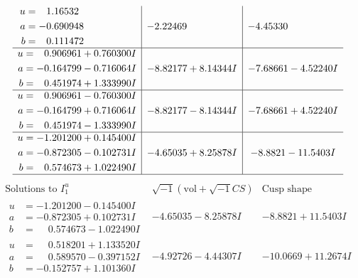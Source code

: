 \documentclass[1p]{elsarticle_modified}
\theoremstyle{definition}
\newcommand{\I}{\sqrt{-1}}
\begin{document}
$$\begin{array}{c|c|c}
\begin{aligned}
u &= \phantom{-}1.16532\phantom{ +0.000000I} \\
a &= -0.690948\phantom{ +0.000000I} \\
b &= \phantom{-}0.111472\phantom{ +0.000000I}\end{aligned}
 & -2.22469\phantom{ +0.000000I} & -4.45330\phantom{ +0.000000I} \\ \hline\begin{aligned}
u &= \phantom{-}0.906961 + 0.760300 I \\
a &= -0.164799 - 0.716064 I \\
b &= \phantom{-}0.451974 + 1.333990 I\end{aligned}
 & -8.82177 + 8.14344 I & -7.68661 - 4.52240 I \\ \hline\begin{aligned}
u &= \phantom{-}0.906961 - 0.760300 I \\
a &= -0.164799 + 0.716064 I \\
b &= \phantom{-}0.451974 - 1.333990 I\end{aligned}
 & -8.82177 - 8.14344 I & -7.68661 + 4.52240 I \\ \hline\begin{aligned}
u &= -1.201200 + 0.145400 I \\
a &= -0.872305 - 0.102731 I \\
b &= \phantom{-}0.574673 + 1.022490 I\end{aligned}
 & -4.65035 + 8.25878 I & -8.8821 - 11.5403 I\\
 \hline 
 \end{array}$$\newpage$$\begin{array}{c|c|c}  
\text{Solutions to }I^u_{1}& \I (\text{vol} + \sqrt{-1}CS) & \text{Cusp shape}\\
 \hline 
\begin{aligned}
u &= -1.201200 - 0.145400 I \\
a &= -0.872305 + 0.102731 I \\
b &= \phantom{-}0.574673 - 1.022490 I\end{aligned}
 & -4.65035 - 8.25878 I & -8.8821 + 11.5403 I \\ \hline\begin{aligned}
u &= \phantom{-}0.518201 + 1.133520 I \\
a &= \phantom{-}0.589570 - 0.397152 I \\
b &= -0.152757 + 1.101360 I\end{aligned}
 & -4.92726 - 4.44307 I & -10.0669 + 11.2674 I \\ \hline\begin{aligned}

\end{aligned}
\end{array}$$
\end{document}
